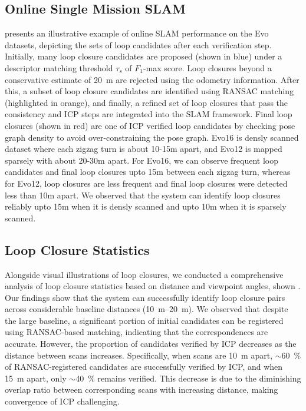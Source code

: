 \subsection*{Online Single Mission SLAM }
 presents an illustrative example of online SLAM performance on the Evo datasets, depicting the sets of loop candidates after each verification step. Initially, many loop closure candidates are proposed (shown in blue) under a descriptor matching threshold $\tau_{s}$ of $F_1$-max score. Loop closures beyond a conservative estimate of \SI{20}{\meter} are rejected using the odometry information. After this, a subset of loop closure candidates are identified using RANSAC matching (highlighted in orange), and finally, a refined set of loop closures that pass the consistency and ICP steps are integrated into the SLAM framework. Final loop closures (shown in red) are one of ICP verified loop candidates by checking pose graph density to avoid over-constraining the pose graph. Evo16 is densly scanned dataset where each zigzag turn is about 10-15m apart, and Evo12 is mapped sparsely with about 20-30m apart. For Evo16, we can observe frequent loop candidates and final loop closures upto 15m between each zigzag turn, whereas for Evo12, loop closures are less frequent and final loop closures were detected less than 10m apart. We observed that the system can identify loop closures reliably upto 15m when it is densly scanned and upto 10m when it is sparsely scanned.  






\subsection*{Loop Closure Statistics}
Alongside visual illustrations of loop closures, we conducted a comprehensive analysis of loop closure statistics based on distance and viewpoint angles, shown . Our findings show that the system can successfully identify loop closure pairs across considerable baseline distances (\SIrange{10}{20}{\meter}). We observed that despite the large baseline, a significant portion of initial candidates can be registered using RANSAC-based matching, indicating that the correspondences are accurate. However, the proportion of candidates verified by ICP decreases as the distance between scans increases. Specifically, when scans are \SI{10}{\meter} apart, $\sim$\SI{60}{\percent} of RANSAC-registered candidates are successfully verified by ICP, and when \SI{15}{\meter} apart, only $\sim$\SI{40}{\percent} remains verified. This decrease is due to the diminishing overlap ratio between corresponding scans with increasing distance, making convergence of ICP challenging.


